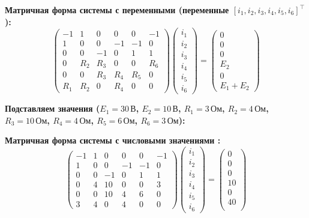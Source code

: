 \textbf{Матричная форма системы с переменными (переменные $[i_1, i_2, i_3, i_4, i_5, i_6]^\top$):}
$$\begin{pmatrix}
-1 &  1 &  0 &  0 &  0 & -1 \\
 1 &  0 &  0 & -1 & -1 &  0 \\
 0 &  0 & -1 &  0 &  1 &  1 \\
 0 & R_2 & R_3 &  0 &  0 & R_6 \\
 0 &  0 & R_3 & R_4 & R_5 &  0 \\
R_1 & R_2 &  0 & R_4 &  0 &  0
\end{pmatrix}
\begin{pmatrix}
i_1 \\
i_2 \\
i_3 \\
i_4 \\
 i_5 \\
i_6
\end{pmatrix}
=
\begin{pmatrix}
0 \\
0 \\
0 \\
E_2 \\
0 \\
E_1 + E_2
\end{pmatrix}$$

\textbf{Подставляем значения ($E_1=30\,\text{В}$, $E_2=10\,\text{В}$, $R_1=3\,\text{Ом}$, $R_2=4\,\text{Ом}$, $R_3=10\,\text{Ом}$, $R_4=4\,\text{Ом}$, $R_5=6\,\text{Ом}$, $R_6=3\,\text{Ом}$):}


\textbf{Матричная форма системы с числовыми значениями :}
$$\begin{pmatrix}
-1 &  1 &  0 &  0 &  0 & -1 \\
 1 &  0 &  0 & -1 & -1 &  0 \\
 0 &  0 & -1 &  0 &  1 &  1 \\
 0 &  4 & 10 &  0 &  0 &  3 \\
 0 &  0 & 10 &  4 &  6 &  0 \\
 3 &  4 &  0 &  4 &  0 &  0
\end{pmatrix}
\begin{pmatrix}
i_1 \\
i_2 \\
i_3 \\
i_4 \\
 i_5 \\
i_6
\end{pmatrix}
=
\begin{pmatrix}
0 \\
0 \\
0 \\
10 \\
0 \\
40 \\
\end{pmatrix}$$


